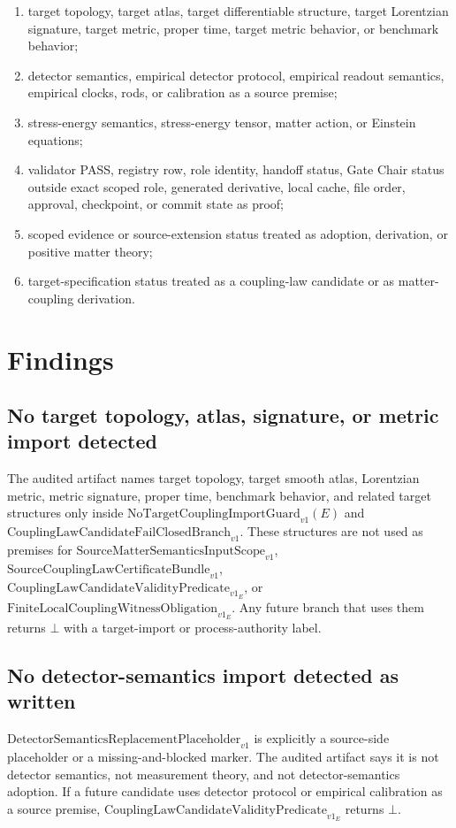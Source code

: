 \documentclass[11pt]{article}
\newcommand{\SCLBundle}{\mathrm{SourceCouplingLawCertificateBundle}_{v1}}
\newcommand{\SMScope}{\mathrm{SourceMatterSemanticsInputScope}_{v1}}
\newcommand{\DetPlaceholder}{\mathrm{DetectorSemanticsReplacementPlaceholder}_{v1}}
\newcommand{\NTGuard}{\mathrm{NoTargetCouplingImportGuard}_{v1}}
\newcommand{\Validity}{\mathrm{CouplingLawCandidateValidityPredicate}_{v1}}
\newcommand{\FailBranch}{\mathrm{CouplingLawCandidateFailClosedBranch}_{v1}}
\newcommand{\WitnessOb}{\mathrm{FiniteLocalCouplingWitnessObligation}_{v1}}
\newcommand{\Bottom}{\bot}
\begin{document}
\begin{enumerate}[label=(\arabic*)]
  \item target topology, target atlas, target differentiable structure,
        target Lorentzian signature, target metric, proper time, target
        metric behavior, or benchmark behavior;
  \item detector semantics, empirical detector protocol, empirical readout
        semantics, empirical clocks, rods, or calibration as a source premise;
  \item stress-energy semantics, stress-energy tensor, matter action, or
        Einstein equations;
  \item validator PASS, registry row, role identity, handoff status, Gate
        Chair status outside exact scoped role, generated derivative, local
        cache, file order, approval, checkpoint, or commit state as proof;
  \item scoped evidence or source-extension status treated as adoption,
        derivation, or positive matter theory;
  \item target-specification status treated as a coupling-law candidate or as
        matter-coupling derivation.
\end{enumerate}

\section{Findings}

\subsection{No target topology, atlas, signature, or metric import detected}

The audited artifact names target topology, target smooth atlas, Lorentzian
metric, metric signature, proper time, benchmark behavior, and related target
structures only inside \(\NTGuard(E)\) and \(\FailBranch\). These structures
are not used as premises for \(\SMScope\), \(\SCLBundle\), \(\Validity_E\), or
\(\WitnessOb_E\). Any future branch that uses them returns \(\Bottom\) with a
target-import or process-authority label.

\subsection{No detector-semantics import detected as written}

\(\DetPlaceholder\) is explicitly a source-side placeholder or a
missing-and-blocked marker. The audited artifact says it is not detector
semantics, not measurement theory, and not detector-semantics adoption. If a
future candidate uses detector protocol or empirical calibration as a source
premise, \(\Validity_E\) returns \(\Bottom\).
\end{document}
